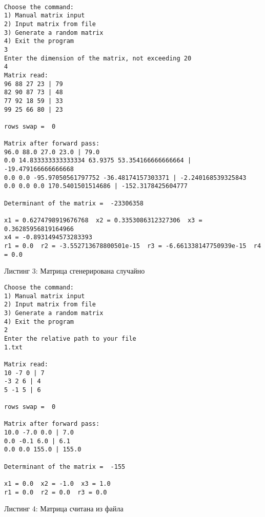 \documentclass[14pt]{article}
\begin{document}
\begin{mdframed}
\small
\begin{verbatim}

Choose the command:
1) Manual matrix input     
2) Input matrix from file  
3) Generate a random matrix
4) Exit the program        
3
Enter the dimension of the matrix, not exceeding 20
4
Matrix read:
96 88 27 23 | 79
82 90 87 73 | 48
77 92 18 59 | 33
99 25 66 80 | 23

rows swap =  0

Matrix after forward pass:
96.0 88.0 27.0 23.0 | 79.0
0.0 14.833333333333334 63.9375 53.354166666666664 |
-19.479166666666668
0.0 0.0 -95.97050561797752 -36.48174157303371 | -2.240168539325843
0.0 0.0 0.0 170.5401501514686 | -152.3178425604777

Determinant of the matrix =  -23306358

x1 = 0.6274798919676768  x2 = 0.3353086312327306  x3 = 0.36285956819164966
x4 = -0.8931494573283393
r1 = 0.0  r2 = -3.552713678800501e-15  r3 = -6.661338147750939e-15  r4 = 0.0

\end{verbatim}
\end{mdframed}
\begin{center}
    Листинг 3: Матрица сгенерирована случайно
\end{center}

\newpage

\begin{mdframed}
\begin{verbatim}
Choose the command:
1) Manual matrix input     
2) Input matrix from file  
3) Generate a random matrix
4) Exit the program        
2
Enter the relative path to your file
1.txt

Matrix read:   
10 -7 0 | 7    
-3 2 6 | 4     
5 -1 5 | 6     

rows swap =  0 

Matrix after forward pass:
10.0 -7.0 0.0 | 7.0
0.0 -0.1 6.0 | 6.1
0.0 0.0 155.0 | 155.0

Determinant of the matrix =  -155

x1 = 0.0  x2 = -1.0  x3 = 1.0
r1 = 0.0  r2 = 0.0  r3 = 0.0

\end{verbatim}
\end{mdframed}
\begin{center}
    Листинг 4: Матрица считана из файла
\end{center}

\newpage
\end{document}
